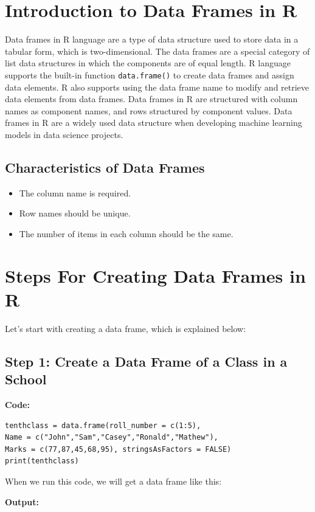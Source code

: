 \documentclass[12pt]{book}
\begin{document}
\section{Introduction to Data Frames in R}

Data frames in R language are a type of data structure used to store data in a tabular form, which is two-dimensional. The data frames are a special category of list data structures in which the components are of equal length. R language supports the built-in function \texttt{data.frame()} to create data frames and assign data elements. R also supports using the data frame name to modify and retrieve data elements from data frames. Data frames in R are structured with column names as component names, and rows structured by component values. Data frames in R are a widely used data structure when developing machine learning models in data science projects.

\subsection{Characteristics of Data Frames}
\begin{itemize}
    \item The column name is required.
    \item Row names should be unique.
    \item The number of items in each column should be the same.
\end{itemize}

\section{Steps For Creating Data Frames in R}

Let’s start with creating a data frame, which is explained below:

\subsection{Step 1: Create a Data Frame of a Class in a School}
\textbf{Code:}
\begin{verbatim}
tenthclass = data.frame(roll_number = c(1:5),
Name = c("John","Sam","Casey","Ronald","Mathew"),
Marks = c(77,87,45,68,95), stringsAsFactors = FALSE)
print(tenthclass)
\end{verbatim}

When we run this code, we will get a data frame like this:

\textbf{Output:}
\end{document}
